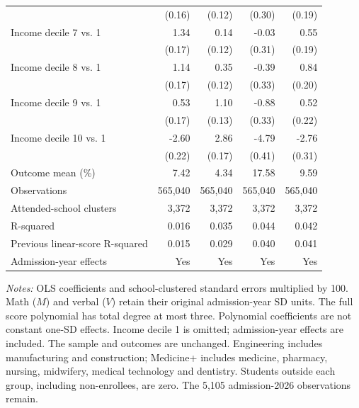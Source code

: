 \begin{table}[!htbp]
\begin{tabular}{lrrrr}
 & (0.16) & (0.12) & (0.30) & (0.19) \\
Income decile 7 vs. 1 & 1.34 & 0.14 & -0.03 & 0.55 \\
 & (0.17) & (0.12) & (0.31) & (0.19) \\
Income decile 8 vs. 1 & 1.14 & 0.35 & -0.39 & 0.84 \\
 & (0.17) & (0.12) & (0.33) & (0.20) \\
Income decile 9 vs. 1 & 0.53 & 1.10 & -0.88 & 0.52 \\
 & (0.17) & (0.13) & (0.33) & (0.22) \\
Income decile 10 vs. 1 & -2.60 & 2.86 & -4.79 & -2.76 \\
 & (0.22) & (0.17) & (0.41) & (0.31) \\
\hline
Outcome mean (\%) & 7.42 & 4.34 & 17.58 & 9.59 \\
Observations & 565,040 & 565,040 & 565,040 & 565,040 \\
Attended-school clusters & 3,372 & 3,372 & 3,372 & 3,372 \\
R-squared & 0.016 & 0.035 & 0.044 & 0.042 \\
Previous linear-score R-squared & 0.015 & 0.029 & 0.040 & 0.041 \\
Admission-year effects & Yes & Yes & Yes & Yes \\
\hline\hline\end{tabular}
\begin{minipage}{0.98\textwidth}\footnotesize
\textit{Notes:} OLS coefficients and school-clustered standard errors multiplied by 100. Math ($M$) and verbal ($V$) retain their original admission-year SD units. The full score polynomial has total degree at most three. Polynomial coefficients are not constant one-SD effects. Income decile 1 is omitted; admission-year effects are included. The sample and outcomes are unchanged. Engineering includes manufacturing and construction; Medicine+ includes medicine, pharmacy, nursing, midwifery, medical technology and dentistry. Students outside each group, including non-enrollees, are zero. The 5,105 admission-2026 observations remain.
\end{minipage}
\end{table}
